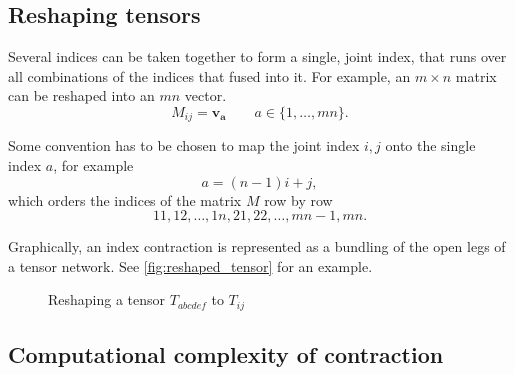 \subsection{Reshaping tensors}
Several indices can be taken together to form a single, joint index, that runs over all
combinations of the indices that fused into it. For example, an $m \times n$ matrix can be
reshaped into an $m n$ vector.
\begin{equation}
  M_{i j} = \bm{v_a} \qquad a \in \{ 1, \dots, m n \}.
\end{equation}

Some convention has to be chosen to map the joint index $i, j$ onto the single index $a$,
for example
\begin{equation}
  a = (n - 1)i + j,
\end{equation}
which orders the indices of the matrix $M$ row by row
\begin{equation}
  1 1, 1 2, \dots, 1 n, 2 1, 2 2, \dots, m n - 1, m n.
\end{equation}

Graphically, an index contraction is represented as a bundling of the open legs of a
tensor network. See \autoref{fig:reshaped_tensor} for an example.

\begin{figure}
  
  \caption{Reshaping a tensor $T_{a b c d e f}$ to $T_{i j}$}
  \label{fig:reshaped_tensor}
\end{figure}

\subsection{Computational complexity of contraction}
